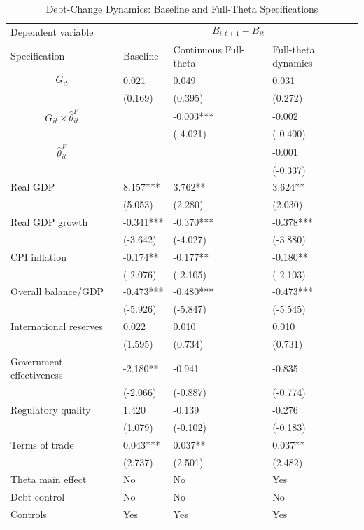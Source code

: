 \begin{table}[H]\centering
\begin{threeparttable}
\caption{Debt-Change Dynamics: Baseline and Full-Theta Specifications}
\label{tab:debt_change_combined_fulltheta}
\scriptsize
\begin{tabularx}{\textwidth}{lYYY}
\toprule
Dependent variable &  \\
\cmidrule(lr){2-4}
Specification & Baseline & Continuous Full-theta & Full-theta dynamics \\
\midrule
$$G_{it}$$ & 0.021 & 0.049 & 0.031 \\
 & (0.169) & (0.395) & (0.272) \\
$$G_{it}\times\widehat{\theta}^{F}_{it}$$ &  & -0.003*** & -0.002 \\
 &  & (-4.021) & (-0.400) \\
$$\widehat{\theta}^{F}_{it}$$ &  &  & -0.001 \\
 &  &  & (-0.337) \\
Real GDP & 8.157*** & 3.762** & 3.624** \\
 & (5.053) & (2.280) & (2.030) \\
Real GDP growth & -0.341*** & -0.370*** & -0.378*** \\
 & (-3.642) & (-4.027) & (-3.880) \\
CPI inflation & -0.174** & -0.177** & -0.180** \\
 & (-2.076) & (-2.105) & (-2.103) \\
Overall balance/GDP & -0.473*** & -0.480*** & -0.473*** \\
 & (-5.926) & (-5.847) & (-5.545) \\
International reserves & 0.022 & 0.010 & 0.010 \\
 & (1.595) & (0.734) & (0.731) \\
Government effectiveness & -2.180** & -0.941 & -0.835 \\
 & (-2.066) & (-0.887) & (-0.774) \\
Regulatory quality & 1.420 & -0.139 & -0.276 \\
 & (1.079) & (-0.102) & (-0.183) \\
Terms of trade & 0.043*** & 0.037** & 0.037** \\
 & (2.737) & (2.501) & (2.482) \\
\midrule
Theta main effect & No & No & Yes \\
Debt control & No & No & No \\
Controls & Yes & Yes & Yes \\

\end{tabularx}
\end{threeparttable}
\end{table}
